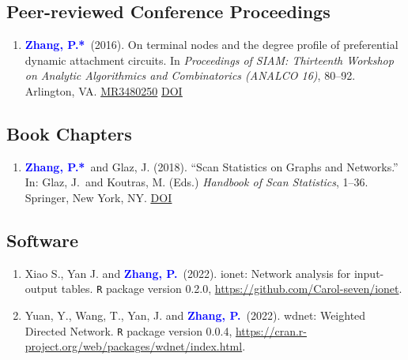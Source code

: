 \documentclass[12pt]{article}
\def\MR#1{\href{http://www.ams.org/mathscinet-getitem?mr=#1}{MR#1}}
\def\DOI#1{\href{http://doi.org/#1}{\underline{DOI}}}
\newcommand{\PZ}{\textcolor{blue}{\textbf{Zhang, P.*}}}
\newcommand{\PZnot}{\textcolor{blue}{\textbf{Zhang, P.}}}
\begin{document}
	\subsection*{Peer-reviewed Conference Proceedings}
	\begin{enumerate}
		\item \PZ\ (2016). On terminal nodes and the degree 
		profile of preferential dynamic attachment circuits. In 
		\emph{Proceedings of SIAM: Thirteenth Workshop on Analytic 
		Algorithmics and Combinatorics (ANALCO 16)}, 80--92. 
		Arlington, VA. \MR{3480250} \DOI{10.1137/1.9781611974324.9}
	\end{enumerate}
	
	\subsection*{Book Chapters}
	\begin{enumerate}
		\item \PZ\ and {\sc Glaz, J.} (2018). ``Scan 
		Statistics on Graphs and Networks.'' In: Glaz, J.\ and Koutras, M. (Eds.) {\em Handbook of Scan Statistics}, 1--36. Springer, New York, NY. 
		\href{https://doi.org/10.1007/978-1-4614-8414-1_43-1}
		{\underline{DOI}}	
	\end{enumerate}
	
	\subsection*{Software}
	\begin{enumerate}
		\item{\sc Xiao S., Yan J.} and \PZnot\ (2022).
		ionet: Network analysis for input-output tables. {\tt R} package version 0.2.0, \url{https://github.com/Carol-seven/ionet}.
		
		\item {\sc Yuan, Y., Wang, T., Yan, J.} and \PZnot\ (2022). 
		wdnet: Weighted Directed Network. {\tt R} package version 0.0.4, \url{https://cran.r-project.org/web/packages/wdnet/index.html}.
	\end{enumerate}
	
\end{document}

